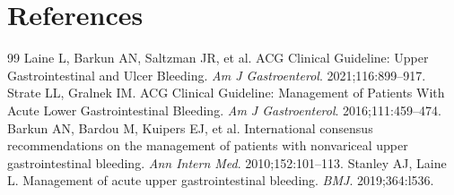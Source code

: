 \section*{References}
\begin{thebibliography}{99}
 Laine L, Barkun AN, Saltzman JR, et al. ACG Clinical Guideline: Upper Gastrointestinal and Ulcer Bleeding. \textit{Am J Gastroenterol}. 2021;116:899--917.
 Strate LL, Gralnek IM. ACG Clinical Guideline: Management of Patients With Acute Lower Gastrointestinal Bleeding. \textit{Am J Gastroenterol}. 2016;111:459--474.
 Barkun AN, Bardou M, Kuipers EJ, et al. International consensus recommendations on the management of patients with nonvariceal upper gastrointestinal bleeding. \textit{Ann Intern Med}. 2010;152:101--113.
 Stanley AJ, Laine L. Management of acute upper gastrointestinal bleeding. \textit{BMJ}. 2019;364:l536.
\end{thebibliography}
